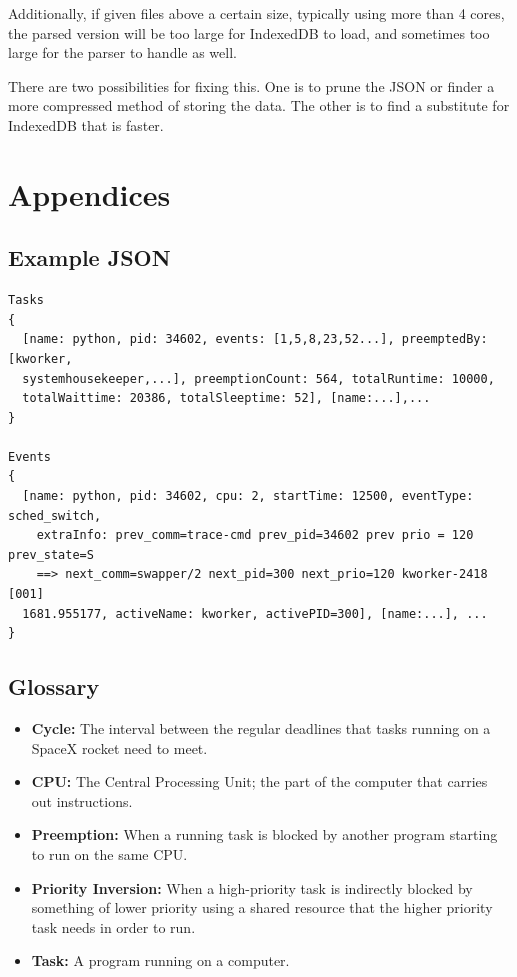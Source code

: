 \documentclass{hmcclinic}
\begin{document}
Additionally, if given files above a certain size, typically using more than 4
cores, the parsed version will be too large for IndexedDB to load, and
sometimes too large for the parser to handle as well.

There are two possibilities for fixing this. One is to prune the JSON or
finder a more compressed method of storing the data. The other is to find a
substitute for IndexedDB that is faster.


\chapter{Appendices}
\newpage
\appendix
\renewcommand{\thesection}{\Alph{section}}
\section{Example JSON} \label{App:AppendixA}

\begin{verbatim}
Tasks
{
  [name: python, pid: 34602, events: [1,5,8,23,52...], preemptedBy: [kworker,
  systemhousekeeper,...], preemptionCount: 564, totalRuntime: 10000,
  totalWaittime: 20386, totalSleeptime: 52], [name:...],...   
}

Events
{
  [name: python, pid: 34602, cpu: 2, startTime: 12500, eventType: sched_switch,
    extraInfo: prev_comm=trace-cmd prev_pid=34602 prev prio = 120 prev_state=S
    ==> next_comm=swapper/2 next_pid=300 next_prio=120 kworker-2418 [001]
  1681.955177, activeName: kworker, activePID=300], [name:...], ...
}
\end{verbatim}

\section{Glossary}
\begin{itemize}[ ]
\item {\bf Cycle:} The interval between the regular deadlines that tasks running on a SpaceX rocket need to meet.
\item {\bf CPU:} The Central Processing Unit; the part of the computer that carries out instructions.
\item {\bf Preemption:} When a running task is blocked by another program starting to run on the same CPU. 
\item {\bf Priority Inversion:} When a high-priority task is indirectly blocked by something of
lower priority using a shared resource that the higher priority task needs in
order to run. 
\item {\bf Task:} A program running on a computer.
\end{itemize}
\end{document}
